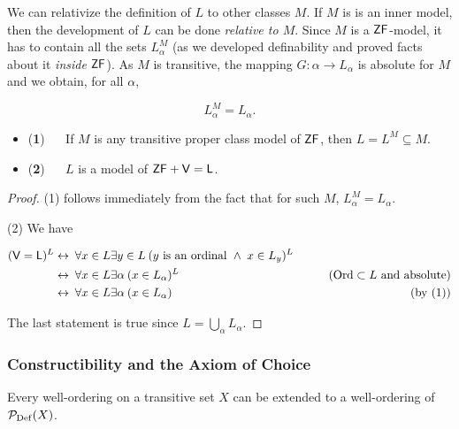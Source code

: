\begin{corollary}
\end{corollary}We can relativize the definition of $L$ to other classes $M$. If $M$ is is an inner model, then the development of $L$ can be done \textit{relative to $M$}. Since $M$ is a $\mathsf{ZF}$-model, it has to contain all the sets $L_\alpha^M$ (as we developed definability and proved facts about it \textit{inside} $\mathsf{ZF}$). As $M$ is transitive, the mapping $G: \alpha \to L_\alpha$ is absolute for $M$ and we obtain, for all $\alpha$,

\begin{equation}
L_\alpha^M = L_\alpha.
\end{equation}

\begin{theorem}\label{thm-l-absolute}\begin{itemize}
\item (\textbf{1}) $\quad$   If $M$ is any transitive proper class model of $\mathsf{ZF}$, then $L = L^M \subseteq  M$.
\item (\textbf{2}) $\quad$   $L$ is a model of $\mathsf{ZF} + \mathsf{V=L}$.
\end{itemize}

\end{theorem}\begin{proof}(1) follows immediately from the fact that for such $M$, $L_\alpha^M = L_\alpha$.

(2) We have

\begin{align*}
    (\mathsf{V=L})^L & \leftrightarrow \: \forall x\in L \exists y \in L \: (y \text{ is an ordinal } \wedge \; x \in L_y)^L & \\
        & \leftrightarrow \: \forall x\in L \exists \alpha \: (x \in L_\alpha)^L  & \qquad \text{($\operatorname{Ord} \subset L$ and absolute)}\\
        & \leftrightarrow \: \forall x\in L \exists \alpha \: (x \in L_\alpha)    & \qquad \text{(by (1))} 
\end{align*}

The last statement is true since $L = \bigcup_{\alpha} L_\alpha$.

\end{proof}\subsubsection{Constructibility and the Axiom of Choice}

Every well-ordering on a transitive set $X$ can be extended to a well-ordering of $\mathcal{P}_{\operatorname{Def}}(X)$.

